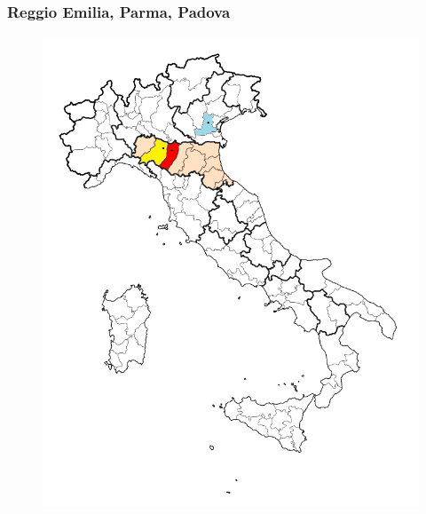 \documentclass[xcolor=table]{beamer}
\begin{document}
\begin{frame}
\frametitle{Reggio Emilia, Parma, Padova} 
\begin{center}
\begin{figure}
\includegraphics[height=1.0\textheight]{3-cities-map.png}
\end{figure}
\end{center}
\end{frame}
\begin{frame}

\end{frame}
\begin{frame}

\end{frame}
\end{document}
